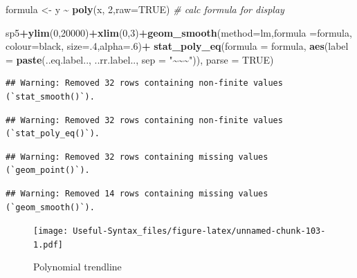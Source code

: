 \documentclass[
]{article}
\newenvironment{Shaded}{\begin{snugshade}}{\end{snugshade}}
\newcommand{\AttributeTok}[1]{\textcolor[rgb]{0.13,0.29,0.53}{#1}}
\newcommand{\CommentTok}[1]{\textcolor[rgb]{0.56,0.35,0.01}{\textit{#1}}}
\newcommand{\ConstantTok}[1]{\textcolor[rgb]{0.56,0.35,0.01}{#1}}
\newcommand{\DecValTok}[1]{\textcolor[rgb]{0.00,0.00,0.81}{#1}}
\newcommand{\FunctionTok}[1]{\textcolor[rgb]{0.13,0.29,0.53}{\textbf{#1}}}
\newcommand{\NormalTok}[1]{#1}
\newcommand{\OtherTok}[1]{\textcolor[rgb]{0.56,0.35,0.01}{#1}}
\newcommand{\SpecialCharTok}[1]{\textcolor[rgb]{0.81,0.36,0.00}{\textbf{#1}}}
\newcommand{\StringTok}[1]{\textcolor[rgb]{0.31,0.60,0.02}{#1}}
\begin{document}
\begin{Shaded}
\begin{Highlighting}[]
\NormalTok{formula }\OtherTok{\textless{}{-}}\NormalTok{ y }\SpecialCharTok{\textasciitilde{}} \FunctionTok{poly}\NormalTok{(x, }\DecValTok{2}\NormalTok{,}\AttributeTok{raw=}\ConstantTok{TRUE}\NormalTok{) }\CommentTok{\# calc formula for display}

\NormalTok{sp5}\SpecialCharTok{+}\FunctionTok{ylim}\NormalTok{(}\DecValTok{0}\NormalTok{,}\DecValTok{20000}\NormalTok{)}\SpecialCharTok{+}\FunctionTok{xlim}\NormalTok{(}\DecValTok{0}\NormalTok{,}\DecValTok{3}\NormalTok{)}\SpecialCharTok{+}\FunctionTok{geom\_smooth}\NormalTok{(}\AttributeTok{method=}\StringTok{\textquotesingle{}lm\textquotesingle{}}\NormalTok{,}\AttributeTok{formula =}\NormalTok{formula,}
                                        \AttributeTok{colour=}\StringTok{\textquotesingle{}black\textquotesingle{}}\NormalTok{, }\AttributeTok{size=}\NormalTok{.}\DecValTok{4}\NormalTok{,}\AttributeTok{alpha=}\NormalTok{.}\DecValTok{6}\NormalTok{)}\SpecialCharTok{+}
  \FunctionTok{stat\_poly\_eq}\NormalTok{(}\AttributeTok{formula =}\NormalTok{ formula,}
               \FunctionTok{aes}\NormalTok{(}\AttributeTok{label =} \FunctionTok{paste}\NormalTok{(..eq.label.., ..rr.label..,}
                                                        \AttributeTok{sep =} \StringTok{"\textasciitilde{}\textasciitilde{}\textasciitilde{}"}\NormalTok{)), }\AttributeTok{parse =} \ConstantTok{TRUE}\NormalTok{)}
\end{Highlighting}
\end{Shaded}

\begin{verbatim}
## Warning: Removed 32 rows containing non-finite values (`stat_smooth()`).
\end{verbatim}

\begin{verbatim}
## Warning: Removed 32 rows containing non-finite values (`stat_poly_eq()`).
\end{verbatim}

\begin{verbatim}
## Warning: Removed 32 rows containing missing values (`geom_point()`).
\end{verbatim}

\begin{verbatim}
## Warning: Removed 14 rows containing missing values (`geom_smooth()`).
\end{verbatim}

\begin{figure}
\centering
\texttt{[image: Useful-Syntax\_files/figure-latex/unnamed-chunk-103-1.pdf]}
\caption{\label{fig:unnamed-chunk-103}Polynomial trendline}
\end{figure}
\end{document}
